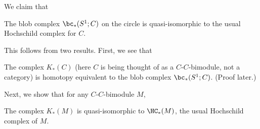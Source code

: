 We claim that
\begin{thm} \label{hochthm}
The blob complex $\bc_*(S^1; C)$ on the circle is quasi-isomorphic to the
usual Hochschild complex for $C$.
\end{thm}

This follows from two results. First, we see that
\begin{lem}
\label{lem:module-blob}%
The complex $K_*(C)$ (here $C$ is being thought of as a
$C$-$C$-bimodule, not a category) is homotopy equivalent to the blob complex
$\bc_*(S^1; C)$. (Proof later.)
\end{lem}

Next, we show that for any $C$-$C$-bimodule $M$,
\begin{prop} \label{prop:hoch}
The complex $K_*(M)$ is quasi-isomorphic to $\HC_*(M)$, the usual
Hochschild complex of $M$.
\end{prop}
